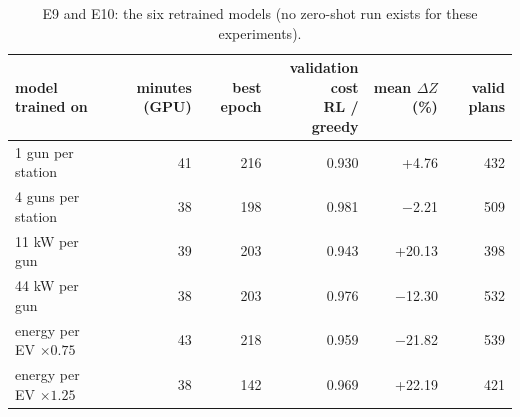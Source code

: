 \begin{table}[H]\centering
\small
\caption{E9 and E10: the six retrained models (no zero-shot run exists for these experiments).}\label{tab:retrainrl}
\begin{adjustbox}{max width=\textwidth}\begin{tabular}{lrrrrr}\toprule
model trained on & minutes (GPU) & best epoch & \shortstack{validation cost\\RL / greedy} & \shortstack{mean $\Delta Z$\\(\%)} & valid plans \\ \midrule
1 gun per station & 41 & 216 & 0.930 & +4.76 & 432 \\
4 guns per station & 38 & 198 & 0.981 & $-$2.21 & 509 \\
11 kW per gun & 39 & 203 & 0.943 & +20.13 & 398 \\
44 kW per gun & 38 & 203 & 0.976 & $-$12.30 & 532 \\
energy per EV $\times0.75$ & 43 & 218 & 0.959 & $-$21.82 & 539 \\
energy per EV $\times1.25$ & 38 & 142 & 0.969 & +22.19 & 421 \\
\bottomrule\end{tabular}\end{adjustbox}\end{table}
